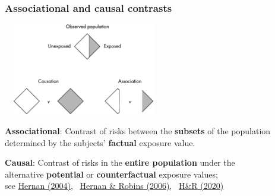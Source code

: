 \documentclass[12pt,dvipsnames,t,aspectratio=169, handout%
]{beamer}
\begin{document}
\begin{frame}
\frametitle{\large Associational and causal contrasts}

\begin{center}
\includegraphics[height=4cm, width=7cm]{hernan-jech-2004}
\end{center}
\pause
\bi
\item
\textbf{Associational}: Contrast of risks between the {\bf subsets} of the population 
determined by the subjects' {\bf factual} exposure value.
\pause
\medskip
\item
\textbf{Causal}: Contrast of risks in the {\bf entire population} under the \\ alternative {\bf potential} or {\bf counterfactual} exposure values; \\ 
{\small see \href{http://dx.doi.org/10.1136/jech.2002.006361}{\color{blue}Hernan (2004)}, \
    \href{http://dx.doi.org/10.1136/jech.2004.029496}{\color{blue}Hernan \& Robins (2006)}, \
		\href{https://www.hsph.harvard.edu/miguel-hernan/causal-inference-book/}{\color{blue}H\&R (2020)} }
\ei
\end{frame}
\end{document}
